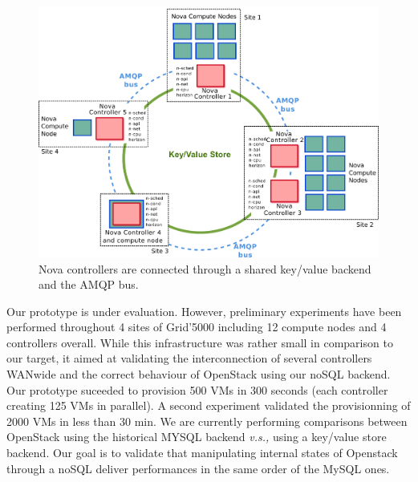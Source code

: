 \begin{figure}[htbp]
        \centering
\vspace*{-.4cm}        \hspace*{-.2cm}\includegraphics[width=.51\textwidth]{figures/OpenStack_distributed.pdf}
        \caption{Nova controllers are connected through a shared key/value backend
        and the AMQP bus.}
      \label{fig:newnova}
\vspace*{-.3cm}
\end{figure}

Our prototype is under evaluation.
However, preliminary experiments  have been performed throughout 4
sites of Grid'5000  including 12 compute nodes  and 4 controllers
overall. While this
infrastructure was rather small in comparison to our target, it aimed
at validating the interconnection of several controllers WANwide and
the correct behaviour of  OpenStack using our noSQL backend.
Our prototype suceeded to provision 500 VMs in 300 seconds
(each controller creating 125 VMs in parallel).
A second experiment validated the provisionning
of 2000 VMs in less than 30 min.  We are currently performing comparisons
between OpenStack using the historical MYSQL backend \textit{v.s.,}
using a key/value store backend. Our goal is to validate that
manipulating internal states of Openstack through
a noSQL deliver performances in the same order of the MySQL
ones.
